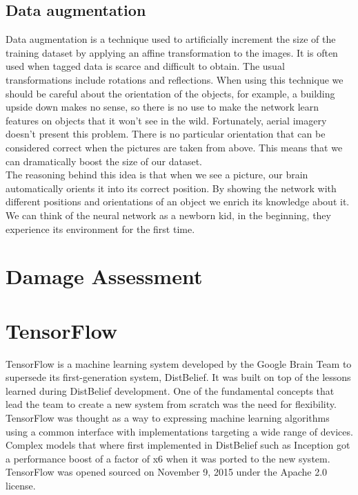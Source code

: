 \subsection{Data augmentation}

Data augmentation is a technique used to artificially increment the size of the training dataset by applying an affine transformation to the images. It is often used when tagged data is scarce and difficult to obtain. The usual transformations include rotations and reflections. When using this technique we should be careful about the orientation of the objects, for example, a building upside down makes no sense, so there is no use to make the network learn features on objects that it won't see in the wild. Fortunately, aerial imagery doesn't present this problem. There is no particular orientation that can be considered correct when the pictures are taken from above. This means that we can dramatically boost the size of our dataset.\\

The reasoning behind this idea is that when we see a picture, our brain automatically orients it into its correct position. By showing the network with different positions and orientations of an object we enrich its knowledge about it.\\

We can think of the neural network as a newborn kid, in the beginning, they experience its environment for the first time.\\



\section{Damage Assessment}



\section{TensorFlow}

TensorFlow is a machine learning system developed by the Google Brain Team to supersede its first-generation system, DistBelief. It was built on top of the lessons learned during DistBelief development. One of the fundamental concepts that lead the team to create a new system from scratch was the need for flexibility. TensorFlow was thought as a way to expressing machine learning algorithms using a common interface with implementations targeting a wide range of devices. Complex models that where first implemented in DistBelief such as Inception got a performance boost of a factor of x6 \cite{tensorflow2015-whitepaper} when it was ported to the new system. TensorFlow was opened sourced on November 9, 2015 under the Apache 2.0 license.\\ 

